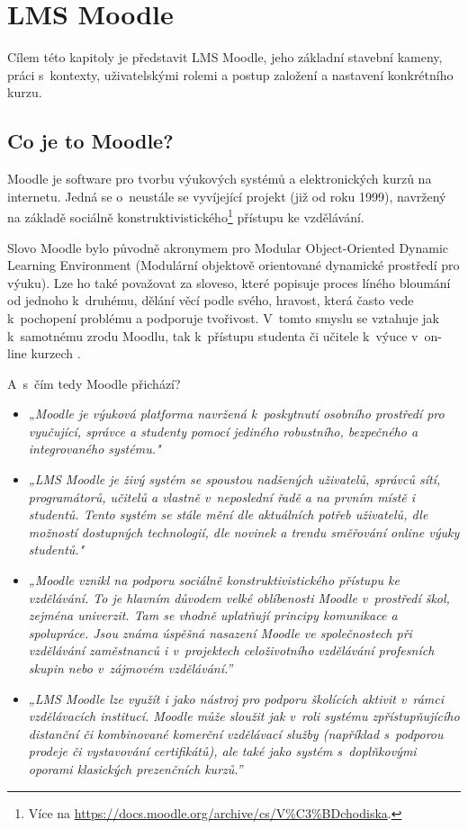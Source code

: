 \documentclass[
print,
  11pt,
  table,   
  nolof,    
  nolot,
  oneside,final
]{fithesis3}
\begin{document}
\chapter{LMS Moodle}
Cílem této kapitoly je představit LMS Moodle, jeho základní stavební kameny, práci s~kontexty, uživatelskými rolemi  a postup založení a nastavení konkrétního kurzu.

	\section{Co je to Moodle?}

Moodle je software pro tvorbu výukových systémů a elektronických kurzů na internetu. Jedná se o~neustále se vyvíjející projekt (již od roku 1999), navržený na základě sociálně konstruktivistického\footnote{Více na \url{https://docs.moodle.org/archive/cs/V\%C3\%BDchodiska}.}  přístupu ke vzdělávání.  

Slovo Moodle bylo původně akronymem pro Modular Object-Oriented Dynamic Learning Environment (Modulární objektově orientované dynamické prostředí pro výuku). Lze ho také považovat za sloveso, které popisuje proces líného bloumání od jednoho k~druhému, dělání věcí podle svého, hravost, která často vede k~pochopení problému a podporuje tvořivost. V~tomto smyslu se vztahuje jak k~samotnému zrodu Moodlu, tak k~přístupu studenta či učitele k~výuce v~on-line kurzech \cite{moodle-what-is}. 

A~s~čím tedy Moodle přichází?
\begin{itemize}
\item \emph{„Moodle je výuková platforma navržená k~poskytnutí osobního prostředí pro vyučující, správce a studenty pomocí jediného robustního, bezpečného a integrovaného systému."}\cite{moodle-about}	
\item \emph{„LMS Moodle je živý systém se spoustou nadšených uživatelů, správců sítí, programátorů, učitelů a vlastně v~neposlední řadě a na prvním místě i studentů. Tento systém se stále mění dle aktuálních potřeb uživatelů, dle možností dostupných technologií, dle novinek a trendu směřování online výuky studentů."}\cite{cznic}
\item \emph{„Moodle vznikl na podporu sociálně konstruktivistického přístupu ke vzdělávání. To je hlavním důvodem velké oblíbenosti Moodle v~prostředí škol, zejména univerzit. Tam se vhodně uplatňují principy komunikace a spolupráce. Jsou známa úspěšná nasazení Moodle ve společnostech při vzdělávání zaměstnanců i v~projektech celoživotního vzdělávání profesních skupin nebo v~zájmovém vzdělávání.”} \cite{pdcmoodle}
\item \emph{„LMS Moodle lze využít i jako nástroj pro podporu školících aktivit v~rámci vzdělávacích institucí. Moodle může sloužit jak v~roli systému zpřístupňujícího distanční či kombinované komerční vzdělávací služby (například s~podporou prodeje či vystavování certifikátů), ale také jako systém s~doplňkovými oporami klasických prezenčních kurzů.” }\cite{pdcmoodleinst}
\end{itemize}
\end{document}
